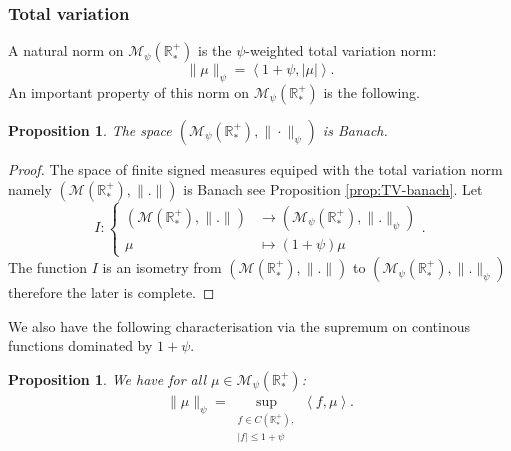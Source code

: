 \documentclass[11pt,a4paper]{article}
\newcommand{\RRP}{\mathbb{R}^+_*}
\newcommand{\MC}{\mathcal{M}}
\newcommand{\brac}[1]{\left\langle#1\right\rangle}
\newtheorem{proposition}[theorem]{Proposition}
\begin{document}
\subsubsection*{Total variation}
A natural norm on $\MC_{\psi}(\RRP)$ is the $\psi$-weighted total variation norm:
\[
\|\mu\|_{\psi} = \brac{1 + \psi, |\mu|}.
\]
An important property of this norm on $\MC_{\psi}(\RRP)$ is the following.
\begin{proposition}
    The space $\left(\MC_{\psi}(\RRP),\|\cdot\|_{\psi} \right)$ is Banach.
\end{proposition}
\begin{proof}
    The space of finite signed measures equiped with the total variation norm namely \(\left(\MC\left(\RRP\right),\| .\|\right) \) is Banach see Proposition \ref{prop:TV-banach}. Let 
    \begin{equation*}
        I :
        \left\lbrace
        \begin{aligned}
            \left(\MC\left(\RRP\right),\| .\|\right) &\to \left(\MC_{\psi}\left(\RRP\right),\| .\|_{\psi}\right) \\
            \mu &\mapsto (1 +\psi) \mu
        \end{aligned}
        \right. .
    \end{equation*}
    The function $I$ is an isometry from \(\left(\MC\left(\RRP\right),\| .\|\right) \) to \(\left(\MC_{\psi}\left(\RRP\right),\| .\|_{\psi}\right) \) therefore the later is complete.
\end{proof}
We also have the following characterisation via the supremum on continous functions dominated by $1 + \psi$.
\begin{proposition}
    We have for all $\mu \in \MC_{\psi}(\RRP)$:
    \begin{align*}
        \|\mu\|_{\psi} = \sup\limits_{\substack{f \in C(\RRP), \\ |f| \leq 1 + \psi}} \brac{f,\mu}.
    \end{align*}
\end{proposition}
\end{document}
